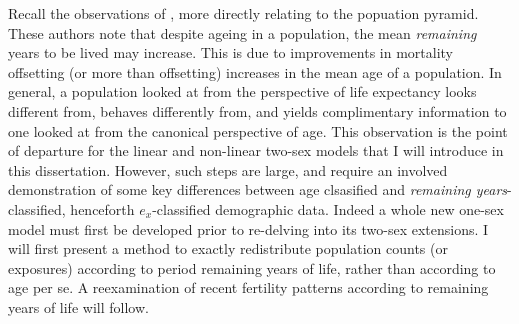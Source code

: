  \FloatBarrier
Recall the observations of \citet{sanderson2005average}, more directly
relating to the popuation pyramid. These authors note that despite ageing in a
population, the mean \textit{remaining} years to be lived may increase. This is due 
to improvements in mortality offsetting (or more than offsetting) increases in
the mean age of a population. In general, a population looked at from the
perspective of life expectancy looks different from, behaves differently from,
and yields complimentary information to one looked at from the canonical
perspective of age. This observation is the point of departure for the
linear and non-linear two-sex models that I will introduce in this dissertation.
However, such steps are large, and require an involved demonstration of some
key differences between age clsasified and \textit{remaining years}-classified,
henceforth $e_x$-classified demographic data. Indeed a whole new one-sex
model must first be developed prior to re-delving into its two-sex extensions. 
I will first present a method
to exactly redistribute population counts (or exposures) according to period 
remaining years of life, rather than according to age per se. A reexamination 
of recent fertility patterns according to remaining years of life will follow.
